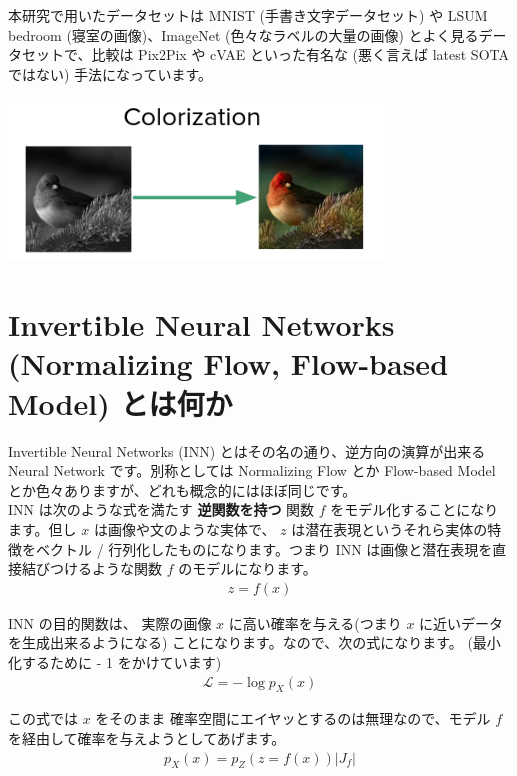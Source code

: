 \documentclass[a4paper, dvipdfmx, 10pt]{article}
\begin{document}
本研究で用いたデータセットは MNIST (手書き文字データセット) や LSUM bedroom (寝室の画像)、ImageNet (色々なラベルの大量の画像) とよく見るデータセットで、比較は Pix2Pix や cVAE といった有名な (悪く言えば latest SOTA ではない) 手法になっています。\\

\begin{center}
\includegraphics[width=10cm]{./img/colorization.png}
\end{center}
\section{Invertible Neural Networks (Normalizing Flow, Flow-based Model) とは何か}
\label{sec:org7ed3174}
Invertible Neural Networks (INN) とはその名の通り、逆方向の演算が出来る Neural Network です。別称としては Normalizing Flow とか Flow-based Model とか色々ありますが、どれも概念的にはほぼ同じです。\\

INN は次のような式を満たす \textbf{逆関数を持つ} 関数 \(f\) をモデル化することになります。但し \(x\) は画像や文のような実体で、 \(z\) は潜在表現というそれら実体の特徴をベクトル / 行列化したものになります。つまり INN は画像と潜在表現を直接結びつけるような関数 \(f\) のモデルになります。\\

\begin{eqnarray}
z = f(x)
\end{eqnarray}

INN の目的関数は、 実際の画像 \(x\) に高い確率を与える(つまり \(x\) に近いデータを生成出来るようになる) ことになります。なので、次の式になります。 (最小化するために - 1 をかけています)\\

\begin{eqnarray}
\mathcal{L} = - \log{p_X(x)}
\end{eqnarray}

この式では \(x\) をそのまま 確率空間にエイヤッとするのは無理なので、モデル \(f\) を経由して確率を与えようとしてあげます。\\
\begin{eqnarray}
p_X(x) = p_Z(z = f(x))|J_f|
\end{eqnarray}
\end{document}
